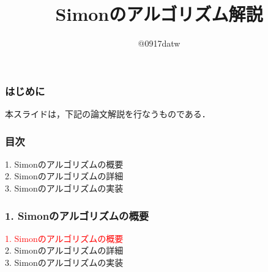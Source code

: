 \documentclass[dvipdfmx,12pt]{beamer}%
\title{Simonのアルゴリズム解説}
\author[Laplace0917]{@0917datw}
\date{}
\begin{document}
\maketitle


\begin{frame}

\frametitle{はじめに}

本スライドは，下記の論文解説を行なうものである．\\
  
\vspace{25pt}

\begin{center}
    
\end{center}

\end{frame}


\begin{frame}

\frametitle{目次}

1. Simonのアルゴリズムの概要 \\
2. Simonのアルゴリズムの詳細 \\
3. Simonのアルゴリズムの実装 \\
    
\end{frame}


\begin{frame}

\frametitle{1. Simonのアルゴリズムの概要}
  
\textcolor{red}{1. Simonのアルゴリズムの概要} \\
2. Simonのアルゴリズムの詳細 \\
3. Simonのアルゴリズムの実装 \\
      
\end{frame}
\end{document}
